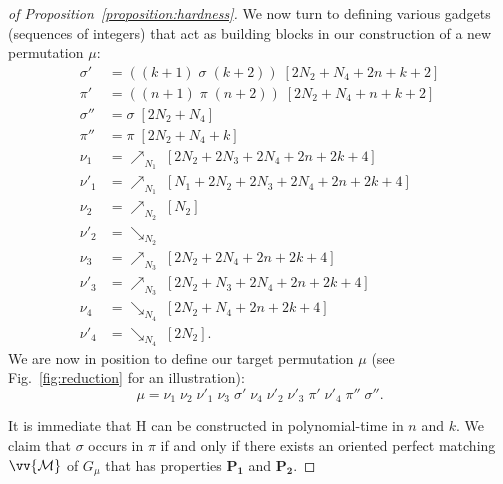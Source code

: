 \documentclass[a4paper]{llncs}
\begin{document}
\begin{proof}[of Proposition~\ref{proposition:hardness}]
  We now turn to defining various gadgets (sequences of integers)
  that act as building blocks in our construction of a new permutation $\mu$:
  \begin{align*}
  \sigma'  &= ((k+1) \; \sigma \; (k+2)) \; [2N_2 + N_4 + 2n + k + 2] \\
  \pi'     &= ((n+1) \; \pi \; (n+2)) \; [2N_2 + N_4 + n + k + 2] \\
  \sigma'' &= \sigma \; [2N_2 + N_4] \\
  \pi''    &= \pi \; [2N_2 + N_4 + k] \\
  \nu_1    &= \nearrow_{N_1} \; [2N_2 + 2N_3 + 2N_4 + 2n + 2k + 4] \\
  \nu'_1   &= \nearrow_{N_1} \; [N_1 + 2N_2 + 2N_3 + 2N_4 + 2n + 2k + 4] \\
  \nu_2    &= \nearrow_{N_2} \; [N_2] \\
  \nu'_2   &= \searrow_{N_2} \\
  \nu_3    &= \nearrow_{N_3} \; [2N_2 + 2N_4 + 2n + 2k + 4] \\
  \nu'_3   &= \nearrow_{N_3} \; [2N_2 + N_3 + 2N_4 + 2n + 2k + 4] \\
  \nu_4    &= \searrow_{N_4} \; [2N_2 + N_4 + 2n + 2k + 4] \\
  \nu'_4   &= \searrow_{N_4} \; [2N_2]\text{.}
  \end{align*}
  We are now in position to define our target permutation $\mu$
  (see Fig.~\ref{fig:reduction} for an illustration):
  $$
  \mu
  =
  \nu_1 \; \nu_2 \; \nu'_1 \; \nu_3 \; \sigma' \; \nu_4 \; \nu'_2 \; \nu'_3 \; \pi' \; \nu'_4 \; \pi'' \; \sigma''
  \text{.}
  $$

  It is immediate that H can be constructed in polynomial-time in $n$ and $k$.
  We claim that $\sigma$ occurs in $\pi$ if and only if
  there exists an oriented perfect matching
  $\vv{\mathcal{M}}$ of $G_\mu$ that has properties $\mathbf{P_1}$ and
  $\mathbf{P_2}$.


\end{proof}
\end{document}
